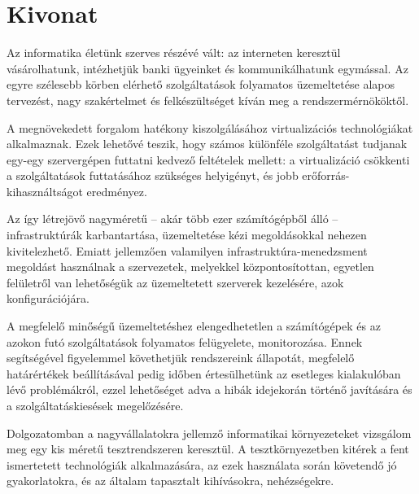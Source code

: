 \setcounter{page}{1}

\selecthungarian

\chapter*{Kivonat}

Az informatika életünk szerves részévé vált: az interneten keresztül vásárolhatunk, intézhetjük banki ügyeinket és kommunikálhatunk egymással. Az egyre szélesebb körben elérhető szolgáltatások folyamatos üzemeltetése alapos tervezést, nagy szakértelmet és felkészültséget kíván meg a rendszermérnököktől.

A megnövekedett forgalom hatékony kiszolgálásához virtualizációs technológiákat alkalmaznak. Ezek lehetővé teszik, hogy számos különféle szolgáltatást tudjanak egy-egy szervergépen futtatni kedvező feltételek mellett: a virtualizáció csökkenti a szolgáltatások futtatásához szükséges helyigényt, és jobb erőforrás-kihasználtságot eredményez.

Az így létrejövő nagyméretű -- akár több ezer számítógépből álló -- infrastruktúrák karbantartása, üzemeltetése kézi megoldásokkal nehezen kivitelezhető. Emiatt jellemzően valamilyen infrastruktúra-menedzsment megoldást használnak a szervezetek, melyekkel központosítottan, egyetlen felületről van lehetőségük az üzemeltetett szerverek kezelésére, azok konfigurációjára.

A megfelelő minőségű üzemeltetéshez elengedhetetlen a számítógépek és az azokon futó szolgáltatások folyamatos felügyelete, monitorozása. Ennek segítségével figyelemmel követhetjük rendszereink állapotát, megfelelő határértékek beállításával pedig időben értesülhetünk az esetleges kialakulóban lévő problémákról, ezzel lehetőséget adva a hibák idejekorán történő javítására és a szolgáltatáskiesések megelőzésére.

Dolgozatomban a nagyvállalatokra jellemző informatikai környezeteket vizsgálom meg egy kis méretű tesztrendszeren keresztül. A tesztkörnyezetben kitérek a fent ismertetett technológiák alkalmazására, az ezek használata során követendő jó gyakorlatokra, és az általam tapasztalt kihívásokra, nehézségekre.


\vfill
\selectenglish


